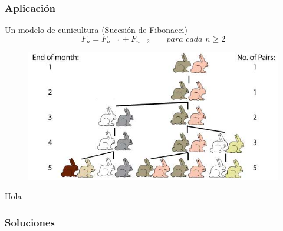 \begin{frame}
	\frametitle{Aplicación}
	\begin{block}{Un modelo de cunicultura (Sucesión de Fibonacci)}
		$$F_n = F_{n-1} + F_{n-2} \qquad \textit{para cada $n \geq 2$}$$
	\end{block}
	
	\begin{block}{}
		\begin{figure}
			\centering
			\includegraphics[scale=0.40]{conejos.jpg}
		\end{figure}
	\end{block}
	
\end{frame}

\begin{frame}
	Hola
	\frametitle{Soluciones}
\end{frame}